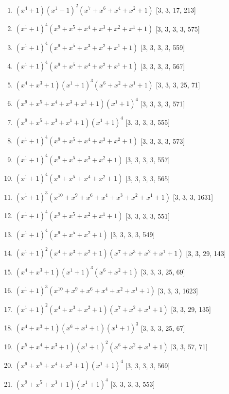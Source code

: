 \documentclass[10pt,twocolumn]{article}
\begin{document}
\begin{enumerate}
\item $(x^{4} + 1)(x^{1} + 1)^{2}(x^{7} + x^{6} + x^{4} + x^{2} + 1)$  [3, 3, 17, 213]
\item $(x^{1} + 1)^{4}(x^{9} + x^{5} + x^{4} + x^{3} + x^{2} + x^{1} + 1)$  [3, 3, 3, 3, 575]
\item $(x^{1} + 1)^{4}(x^{9} + x^{5} + x^{3} + x^{2} + x^{1} + 1)$  [3, 3, 3, 3, 559]
\item $(x^{1} + 1)^{4}(x^{9} + x^{5} + x^{4} + x^{2} + x^{1} + 1)$  [3, 3, 3, 3, 567]
\item $(x^{4} + x^{3} + 1)(x^{1} + 1)^{3}(x^{6} + x^{2} + x^{1} + 1)$  [3, 3, 3, 25, 71]
\item $(x^{9} + x^{5} + x^{4} + x^{3} + x^{1} + 1)(x^{1} + 1)^{4}$  [3, 3, 3, 3, 571]
\item $(x^{9} + x^{5} + x^{3} + x^{1} + 1)(x^{1} + 1)^{4}$  [3, 3, 3, 3, 555]
\item $(x^{1} + 1)^{4}(x^{9} + x^{5} + x^{4} + x^{3} + x^{2} + 1)$  [3, 3, 3, 3, 573]
\item $(x^{1} + 1)^{4}(x^{9} + x^{5} + x^{3} + x^{2} + 1)$  [3, 3, 3, 3, 557]
\item $(x^{1} + 1)^{4}(x^{9} + x^{5} + x^{4} + x^{2} + 1)$  [3, 3, 3, 3, 565]
\item $(x^{1} + 1)^{3}(x^{10} + x^{9} + x^{6} + x^{4} + x^{3} + x^{2} + x^{1} + 1)$  [3, 3, 3, 1631]
\item $(x^{1} + 1)^{4}(x^{9} + x^{5} + x^{2} + x^{1} + 1)$  [3, 3, 3, 3, 551]
\item $(x^{1} + 1)^{4}(x^{9} + x^{5} + x^{2} + 1)$  [3, 3, 3, 3, 549]
\item $(x^{1} + 1)^{2}(x^{4} + x^{3} + x^{2} + 1)(x^{7} + x^{3} + x^{2} + x^{1} + 1)$  [3, 3, 29, 143]
\item $(x^{4} + x^{3} + 1)(x^{1} + 1)^{3}(x^{6} + x^{2} + 1)$  [3, 3, 3, 25, 69]
\item $(x^{1} + 1)^{3}(x^{10} + x^{9} + x^{6} + x^{4} + x^{2} + x^{1} + 1)$  [3, 3, 3, 1623]
\item $(x^{1} + 1)^{2}(x^{4} + x^{3} + x^{2} + 1)(x^{7} + x^{2} + x^{1} + 1)$  [3, 3, 29, 135]
\item $(x^{4} + x^{3} + 1)(x^{6} + x^{1} + 1)(x^{1} + 1)^{3}$  [3, 3, 3, 25, 67]
\item $(x^{5} + x^{4} + x^{3} + 1)(x^{1} + 1)^{2}(x^{6} + x^{2} + x^{1} + 1)$  [3, 3, 57, 71]
\item $(x^{9} + x^{5} + x^{4} + x^{3} + 1)(x^{1} + 1)^{4}$  [3, 3, 3, 3, 569]
\item $(x^{9} + x^{5} + x^{3} + 1)(x^{1} + 1)^{4}$  [3, 3, 3, 3, 553]

\end{enumerate}
\end{document}
